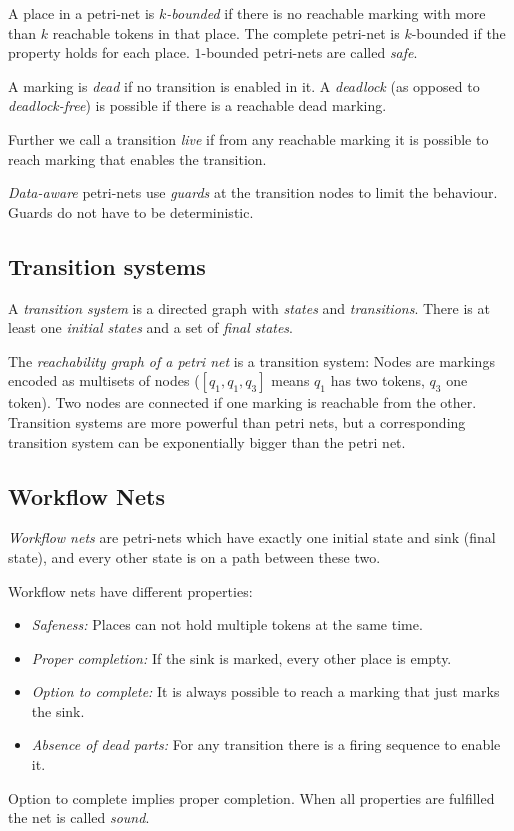\documentclass[english]{panikzettel}
\begin{document}
A place in a petri-net is \emph{$k$-bounded} if there is no reachable marking with more than $k$ reachable tokens in that place.
The complete petri-net is $k$-bounded if the property holds for each place.
$1$-bounded petri-nets are called \emph{safe}.

A marking is \emph{dead} if no transition is enabled in it.
A \emph{deadlock} (as opposed to \emph{deadlock-free}) is possible if there is a reachable dead marking.

Further we call a transition \emph{live} if from any reachable marking it is possible to reach marking that enables the transition.

\emph{Data-aware} petri-nets use \emph{guards} at the transition nodes to limit the behaviour. Guards do not have to be deterministic.

\vspace{-0.5\baselineskip}
\subsection{Transition systems}

A \emph{transition system} is a directed graph with \emph{states} and \emph{transitions}.
There is at least one \emph{initial states} and a set of \emph{final states}.

The \emph{reachability graph of a petri net} is a transition system: Nodes are markings encoded as multisets of nodes ($[q_1, q_1, q_3]$ means $q_1$ has two tokens, $q_3$ one token).
Two nodes are connected if one marking is reachable from the other.
Transition systems are more powerful than petri nets, but a corresponding transition system can be exponentially bigger than the petri net.

\subsection{Workflow Nets}
\emph{Workflow nets} are petri-nets which have exactly one initial state and sink (final state), and every other state is on a path between these two.

Workflow nets have different properties:
\begin{itemize}
    \item \emph{Safeness:} Places can not hold multiple tokens at the same time.
    \item \emph{Proper completion:} If the sink is marked, every other place is empty.
    \item \emph{Option to complete:} It is always possible to reach a marking that just marks the sink.
    \item \emph{Absence of dead parts:} For any transition there is a firing sequence to enable it.
\end{itemize}
Option to complete implies proper completion. When all properties are fulfilled the net is called \emph{sound}.
\end{document}
